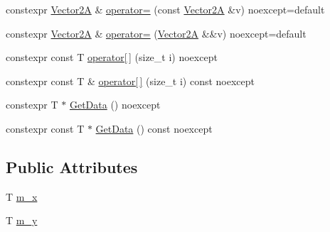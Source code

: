\begin{DoxyCompactItemize}
\item 
constexpr \hyperlink{structmage_1_1_vector2_a}{Vector2A} \& \hyperlink{structmage_1_1_vector2_a_3_01_t_00_01typename_01std_1_1enable__if__t_3_01std_1_1is__arithmetic__b421e7a25afc1ac5972d3b452777021a_a0906b5813b7b8cf932c2423543cb5691}{operator=} (const \hyperlink{structmage_1_1_vector2_a}{Vector2A} \&v) noexcept=default
\item 
constexpr \hyperlink{structmage_1_1_vector2_a}{Vector2A} \& \hyperlink{structmage_1_1_vector2_a_3_01_t_00_01typename_01std_1_1enable__if__t_3_01std_1_1is__arithmetic__b421e7a25afc1ac5972d3b452777021a_a10d9c3d2ec3e045a69f4dbb761685e2a}{operator=} (\hyperlink{structmage_1_1_vector2_a}{Vector2A} \&\&v) noexcept=default
\item 
constexpr const T \hyperlink{structmage_1_1_vector2_a_3_01_t_00_01typename_01std_1_1enable__if__t_3_01std_1_1is__arithmetic__b421e7a25afc1ac5972d3b452777021a_a4fc2a2d76ee2b5b30fb813febf9d1b6e}{operator\mbox{[}$\,$\mbox{]}} (size\+\_\+t i) noexcept
\item 
constexpr const T \& \hyperlink{structmage_1_1_vector2_a_3_01_t_00_01typename_01std_1_1enable__if__t_3_01std_1_1is__arithmetic__b421e7a25afc1ac5972d3b452777021a_a23381393857dde188cd8382d05cfc298}{operator\mbox{[}$\,$\mbox{]}} (size\+\_\+t i) const noexcept
\item 
constexpr T $\ast$ \hyperlink{structmage_1_1_vector2_a_3_01_t_00_01typename_01std_1_1enable__if__t_3_01std_1_1is__arithmetic__b421e7a25afc1ac5972d3b452777021a_a3585c99e49867ec4e893697b147937cd}{Get\+Data} () noexcept
\item 
constexpr const T $\ast$ \hyperlink{structmage_1_1_vector2_a_3_01_t_00_01typename_01std_1_1enable__if__t_3_01std_1_1is__arithmetic__b421e7a25afc1ac5972d3b452777021a_a7a8389a662e0216c0e8cb1c6f0b649d8}{Get\+Data} () const noexcept
\end{DoxyCompactItemize}
\subsection*{Public Attributes}
\begin{DoxyCompactItemize}
\item 
T \hyperlink{structmage_1_1_vector2_a_3_01_t_00_01typename_01std_1_1enable__if__t_3_01std_1_1is__arithmetic__b421e7a25afc1ac5972d3b452777021a_a0e0f036dcea7ca953e4007c5b67578bf}{m\+\_\+x}
\item 
T \hyperlink{structmage_1_1_vector2_a_3_01_t_00_01typename_01std_1_1enable__if__t_3_01std_1_1is__arithmetic__b421e7a25afc1ac5972d3b452777021a_a425ca4ed2df1460e7748e54e65ab5c35}{m\+\_\+y}
\end{DoxyCompactItemize}


